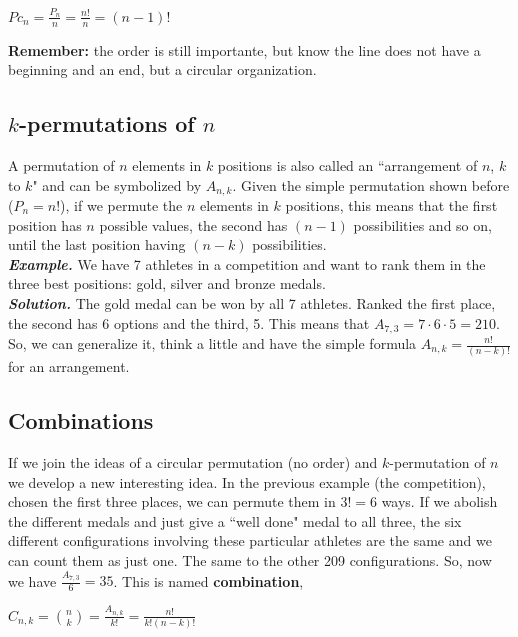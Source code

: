 \documentclass[a4paper,twocolumn]{article}
\begin{document}
\begin{center}
$Pc_n = \frac{P_n}{n} = \frac{n!}{n} = (n - 1)!$
\end{center}

\noindent\textbf{Remember:} the order is still importante, but know the line does not have a beginning and an end, but a circular organization.


\subsection{$k$-permutations of $n$}

A permutation of $n$ elements in $k$ positions is also called an ``arrangement of $n$, $k$ to $k$" and can be symbolized by $A_{n,k}$. Given the simple permutation shown before ($P_n = n!$), if we permute the $n$ elements in $k$ positions, this means that the first position has $n$ possible values, the second has $(n -1)$ possibilities and so on, until the last position having $(n - k)$ possibilities.\\

\noindent\textbf{\textit{Example.}} We have 7 athletes in a competition and want to rank them in the three best positions: gold, silver and bronze medals.\\
\noindent\textbf{\textit{Solution.}} The gold medal can be won by all 7 athletes. Ranked the first place, the second has 6 options and the third, 5. This means that $A_{7,3} = 7 \cdot 6 \cdot 5 = 210$.\\

\noindent So, we can generalize it, think a little and have the simple formula $A_{n,k} = \frac{n!}{(n - k)!}$ for an arrangement.


\subsection{Combinations}

If we join the ideas of a circular permutation (no order) and $k$-permutation of $n$ we develop a new interesting idea. In the previous example (the competition), chosen the first three places, we can permute them in $3! = 6$ ways. If we abolish the different medals and just give a ``well done" medal to all three, the six different configurations involving these particular athletes are the same and we can count them as just one. The same to the other 209 configurations. So, now we have $\frac{A_{7,3}}{6} = 35$. This is named \textbf{combination},

\begin{center}
$C_{n,k} = \binom{n}{k} = \frac{A_{n,k}}{k!} = \frac{n!}{k!(n - k)!}$
\end{center}
\end{document}
